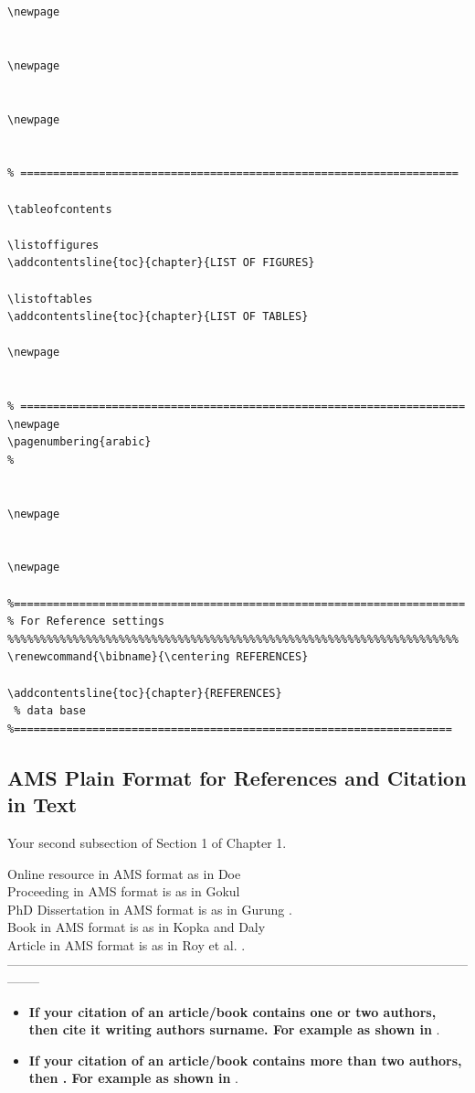 \begin{verbatim}
\newpage


\newpage


\newpage


% ===================================================================

\tableofcontents

\listoffigures
\addcontentsline{toc}{chapter}{LIST OF FIGURES}

\listoftables
\addcontentsline{toc}{chapter}{LIST OF TABLES}

\newpage


% ====================================================================
\newpage
\pagenumbering{arabic}
%


\newpage


\newpage

%=====================================================================
% For Reference settings
%%%%%%%%%%%%%%%%%%%%%%%%%%%%%%%%%%%%%%%%%%%%%%%%%%%%%%%%%%%%%%%%%%%%%
\renewcommand{\bibname}{\centering REFERENCES}

\addcontentsline{toc}{chapter}{REFERENCES}
 % data base
%===================================================================

\end{verbatim}

\subsection{\bf AMS Plain Format for References and Citation in Text}
Your second subsection of Section 1 of Chapter 1.

\noindent
{\color{red}
	Online resource in AMS format as in Doe  \cite{Doe}\\
	Proceeding in AMS format is as in Gokul \cite{Gokul}\\
	PhD Dissertation in AMS format is as in Gurung \cite{db1}.\\
	Book in AMS format is as in Kopka and Daly \cite{HK}\\
	Article in AMS format is as in Roy et al. \cite{db3}.\\
	
}
--------------------------------------------------------------------------------------------------------------------
\begin{itemize}
	\item
	{\bf If your citation of an article/book contains one or two authors, then {\color{red} {cite it writing authors surname}}. For example as shown in {}}.
	\item
	{\bf If your citation of an article/book contains more than two authors, then {\color{red}{cite it writing first author surname followed by et al.}} . For example as shown in {}}.
\end{itemize}

